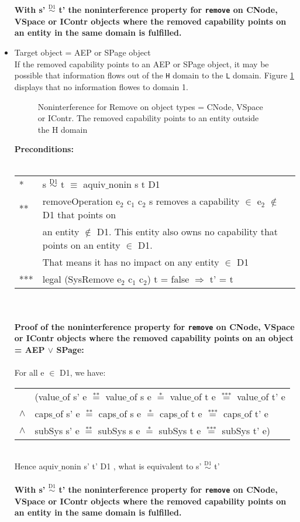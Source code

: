 \begin{itemize}
\textbf{With s' $\overset{\text{D1}}{\sim}$ t' the noninterference property for \texttt{remove} on CNode, VSpace or IContr objects where the removed capability points on an entity in the same domain is fulfilled.}  
\item Target object = AEP or SPage object \\
If the removed capability points to an AEP or SPage object, it may be possible that information flows out of the \texttt{H} domain to the \texttt{L} domain. Figure \ref{fig:RemoveOutside} displays that no information flowes to domain 1.
\begin{figure}[H]
\caption{Noninterference for Remove on object types = CNode, VSpace or IContr. The removed capability points to an entity outside the H domain}
\label{fig:RemoveOutside}
\end{figure}
\textbf{Preconditions:} \\ \\
\begin{tabular}{ll}
* & s $\overset{\text{D1}}{\sim}$ t $\equiv$ aquiv$\_$nonin s t D1	\\ 
** & removeOperation e$_2$ c$_1$ c$_2$ s removes a capability $\in$ e$_2$ $\notin$ D1 that points on \\
& an entity $\notin$ D1. This entity also owns no capability that points on an entity $\in$ D1. \\
& That means it has no impact on any entity $\in$ D1 \\ 
*** & legal (SysRemove e$_2$ c$_1$ c$_2$) t = false $\Rightarrow$ t' = t
\end{tabular} \\ \\ 
\textbf{Proof of the noninterference property for \texttt{remove} on CNode, VSpace or IContr objects where the removed capability points on an object = AEP $\vee$ SPage:}\\ \\
For all e $\in$ D1, we have: \\ 
\begin{tabular}{ll}
& (value$\_$of s' e $\overset{\text{**}}{=}$ value$\_$of s e $\overset{\text{*}}{=}$ value$\_$of t e $\overset{\text{***}}{=}$ value$\_$of t' e \\
$\wedge$ & caps$\_$of s' e $\overset{\text{**}}{=}$ caps$\_$of s e $\overset{\text{*}}{=}$ caps$\_$of t e $\overset{\text{***}}{=}$ caps$\_$of t' e \\
$\wedge$ & subSys s' e $\overset{\text{**}}{=}$ subSys s e $\overset{\text{*}}{=}$ subSys t e $\overset{\text{***}}{=}$ subSys t' e)
\end{tabular} \\
Hence aquiv$\_$nonin s' t' D1 , what is equivalent to s' $\overset{\text{D1}}{\sim}$ t' \\ \\ 
\textbf{With s' $\overset{\text{D1}}{\sim}$ t' the noninterference property for \texttt{remove} on CNode, VSpace or IContr objects where the removed capability points on an entity in the same domain is fulfilled.}  
\end{itemize}
